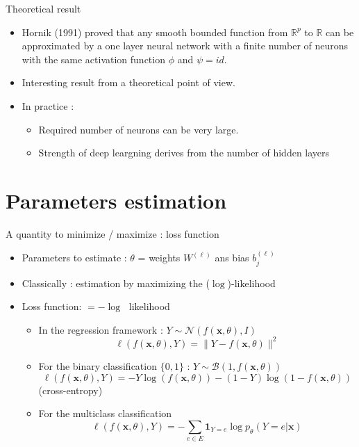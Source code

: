 \documentclass[ignorenonframetext,]{beamer}
\providecommand{\tightlist}{%
  \setlength{\itemsep}{0pt}\setlength{\parskip}{0pt}}
\begin{document}
\begin{frame}{Theoretical result}
\protect\hypertarget{theoretical-result}{}

\begin{itemize}
\item
  Hornik (1991) proved that any smooth bounded function from
  \(\mathbb{R}^p\) to \(\mathbb{R}\) can be approximated by a one layer
  neural network with a finite number of neurons with the same
  activation function \(\phi\) and \(\psi = id\).
\item
  Interesting result from a theoretical point of view.
\item
  In practice :

  \begin{itemize}
  \tightlist
  \item
    Required number of neurons can be very large.
  \item
    Strength of deep leargning derives from the number of hidden layers
  \end{itemize}
\end{itemize}

\end{frame}

\hypertarget{parameters-estimation}{%
\section{Parameters estimation}\label{parameters-estimation}}

\begin{frame}{A quantity to minimize / maximize : loss function}
\protect\hypertarget{a-quantity-to-minimize-maximize-loss-function}{}

\begin{itemize}
\tightlist
\item
  Parameters to estimate : \(\theta\) = weights \(W^{(\ell)}\) ans bias
  \(b^{(\ell)}_j\)
\item
  Classically : estimation by maximizing the (\(\log\))-likelihood\\
\item
  Loss function: \(=-\log\;\) likelihood

  \begin{itemize}
  \item
    In the regression framework :
    \(Y \sim \mathcal{N}(f(\mathbf{x},\theta), I)\)
    \[ \ell(f(\mathbf{x},\theta),Y) = \| Y - f(\mathbf{x},\theta)\|^2\]
  \item
    For the binary classification \(\{0,1\}\) :
    \(Y \sim \mathcal{B}(1,f(\mathbf{x},\theta))\)
    \[ \ell(f(\mathbf{x},\theta),Y) = -Y \log(f(\mathbf{x},\theta)) - (1-Y) \log(1- f(\mathbf{x},\theta))\]
    (cross-entropy)
  \item
    For the multiclass classification
    \[ \ell(f(\mathbf{x},\theta),Y) =-\sum_{e \in E} \mathbf{1}_{Y=e} \log p_{\theta}(Y = e | \mathbf{x} )\]
  \end{itemize}
\end{itemize}

\end{frame}
\end{document}
